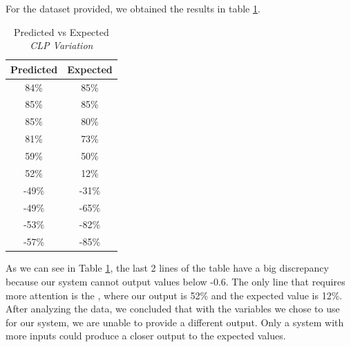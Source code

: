 For the dataset provided, we obtained the results in table \ref{tab:RESULTS_CLP}.
\begin{table}[H]
    \begin{center}
        \begin{tabular}{ |c|c| }
            \hline
            Predicted & Expected \\
            \hline
            84\% & 85\% \\
            85\% & 85\% \\
            85\% & 80\% \\
            81\% & 73\% \\
            59\% & 50\% \\
            52\% & 12\% \\
            -49\% & -31\% \\
            -49\% & -65\% \\
            -53\% & -82\% \\
            -57\% & -85\% \\
            \hline
        \end{tabular}
        \caption{Predicted vs Expected \textit{CLP Variation}}
        \label{tab:RESULTS_CLP}
    \end{center}
\end{table}

As we can see in Table \ref{tab:RESULTS_CLP}, the last 2 lines of the table have a big discrepancy because our system cannot output values below -0.6. The only line that requires more attention is the , where our output is 52\% and the expected value is 12\%. After analyzing the data, we concluded that with the variables we chose to use for our system, we are unable to provide a different output. Only a system with more inputs could produce a closer output to the expected values.
